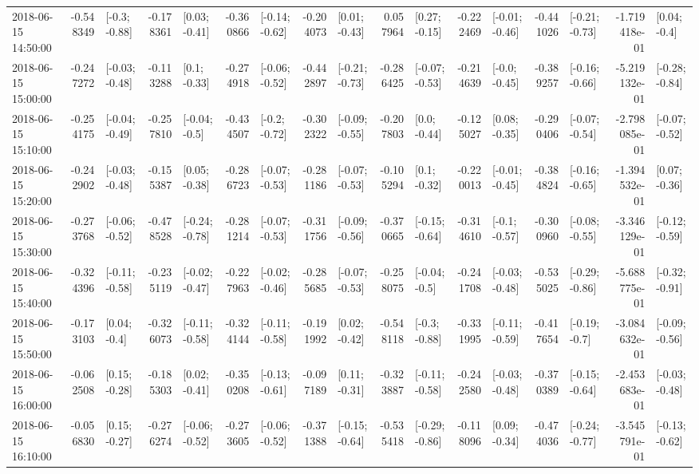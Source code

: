 \begin{tabular}{lrlrlrlrlrlrlrlrl}
2018-06-15 14:50:00 & -0.548349 &   [-0.3; -0.88] & -0.178361 &   [0.03; -0.41] & -0.360866 &  [-0.14; -0.62] & -0.204073 &   [0.01; -0.43] &  0.057964 &   [0.27; -0.15] & -0.222469 &  [-0.01; -0.46] & -0.441026 &  [-0.21; -0.73] & -1.719418e-01 &    [0.04; -0.4] \\
2018-06-15 15:00:00 & -0.247272 &  [-0.03; -0.48] & -0.113288 &    [0.1; -0.33] & -0.274918 &  [-0.06; -0.52] & -0.442897 &  [-0.21; -0.73] & -0.286425 &  [-0.07; -0.53] & -0.214639 &   [-0.0; -0.45] & -0.389257 &  [-0.16; -0.66] & -5.219132e-01 &  [-0.28; -0.84] \\
2018-06-15 15:10:00 & -0.254175 &  [-0.04; -0.49] & -0.257810 &   [-0.04; -0.5] & -0.434507 &   [-0.2; -0.72] & -0.302322 &  [-0.09; -0.55] & -0.207803 &    [0.0; -0.44] & -0.125027 &   [0.08; -0.35] & -0.290406 &  [-0.07; -0.54] & -2.798085e-01 &  [-0.07; -0.52] \\
2018-06-15 15:20:00 & -0.242902 &  [-0.03; -0.48] & -0.155387 &   [0.05; -0.38] & -0.286723 &  [-0.07; -0.53] & -0.281186 &  [-0.07; -0.53] & -0.105294 &    [0.1; -0.32] & -0.220013 &  [-0.01; -0.45] & -0.384824 &  [-0.16; -0.65] & -1.394532e-01 &   [0.07; -0.36] \\
2018-06-15 15:30:00 & -0.273768 &  [-0.06; -0.52] & -0.478528 &  [-0.24; -0.78] & -0.281214 &  [-0.07; -0.53] & -0.311756 &  [-0.09; -0.56] & -0.370665 &  [-0.15; -0.64] & -0.314610 &   [-0.1; -0.57] & -0.300960 &  [-0.08; -0.55] & -3.346129e-01 &  [-0.12; -0.59] \\
2018-06-15 15:40:00 & -0.324396 &  [-0.11; -0.58] & -0.235119 &  [-0.02; -0.47] & -0.227963 &  [-0.02; -0.46] & -0.285685 &  [-0.07; -0.53] & -0.258075 &   [-0.04; -0.5] & -0.241708 &  [-0.03; -0.48] & -0.535025 &  [-0.29; -0.86] & -5.688775e-01 &  [-0.32; -0.91] \\
2018-06-15 15:50:00 & -0.173103 &    [0.04; -0.4] & -0.326073 &  [-0.11; -0.58] & -0.324144 &  [-0.11; -0.58] & -0.191992 &   [0.02; -0.42] & -0.548118 &   [-0.3; -0.88] & -0.331995 &  [-0.11; -0.59] & -0.417654 &   [-0.19; -0.7] & -3.084632e-01 &  [-0.09; -0.56] \\
2018-06-15 16:00:00 & -0.062508 &   [0.15; -0.28] & -0.185303 &   [0.02; -0.41] & -0.350208 &  [-0.13; -0.61] & -0.097189 &   [0.11; -0.31] & -0.323887 &  [-0.11; -0.58] & -0.242580 &  [-0.03; -0.48] & -0.370389 &  [-0.15; -0.64] & -2.453683e-01 &  [-0.03; -0.48] \\
2018-06-15 16:10:00 & -0.056830 &   [0.15; -0.27] & -0.276274 &  [-0.06; -0.52] & -0.273605 &  [-0.06; -0.52] & -0.371388 &  [-0.15; -0.64] & -0.535418 &  [-0.29; -0.86] & -0.118096 &   [0.09; -0.34] & -0.474036 &  [-0.24; -0.77] & -3.545791e-01 &  [-0.13; -0.62] \\

\end{tabular}
